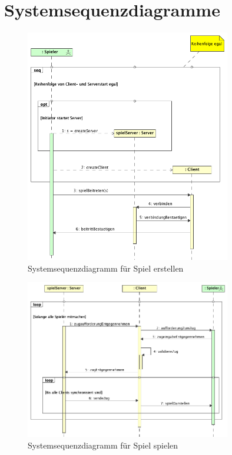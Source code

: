 \documentclass[12pt,halfparskip]{scrartcl}
\begin{document}
\section{Systemsequenzdiagramme}\label{cha:systemsequenzdiagramme} %
\begin{figure}
	[htp] \centering 
	\includegraphics[width=0.8\textwidth]{SSDSpielErstellen.png} \caption{Systemsequenzdiagramm für Spiel erstellen}\label{fig:SSDSpielErstellen.png} 
\end{figure}
\begin{figure}
	[htp] \centering 
	\includegraphics[width=0.8\textwidth]{SSDSpielSpielen.png} \caption{Systemsequenzdiagramm für Spiel spielen}\label{fig:SSDSpielSpielen.png} 
\end{figure}
\end{document}
